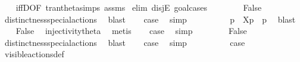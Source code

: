 \begin{isabellebody}
%
\isadelimproof
\ \ %
\endisadelimproof
%
\isatagproof
{}\isamarkupfalse%
\ iffD{}{\isacharbrackleft}{\kern0pt}OF\ tran{\isacharunderscore}{\kern0pt}theta{\isachardot}{\kern0pt}simps\ assms{\isacharbrackright}{\kern0pt}\isanewline
{}\isamarkupfalse%
\ {\isacharparenleft}{\kern0pt}elim\ disjE{\isacharcomma}{\kern0pt}\ goal{\isacharunderscore}{\kern0pt}cases{\isacharparenright}{\kern0pt}\isanewline
\ \ \isamarkupfalse%
\ {}\isanewline
\ \ \isamarkupfalse%
\ False\ \isamarkupfalse%
\ distinctness{\isacharunderscore}{\kern0pt}special{\isacharunderscore}{\kern0pt}actions\ \isamarkupfalse%
\ blast\isanewline
\ \ \isamarkupfalse%
\ {\isacharquery}{\kern0pt}case\ \isamarkupfalse%
\ simp\isanewline
{}\isamarkupfalse%
\isanewline
\ \ \isamarkupfalse%
\ {}\isanewline
\ \ \isamarkupfalse%
\ \isamarkupfalse%
\ p{\isacharprime}{\kern0pt}\ \ {\isacartoucheopen}{\isasymtheta}{\isacharbrackleft}{\kern0pt}X{\isacharbrackright}{\kern0pt}{\isacharparenleft}{\kern0pt}p{\isacharparenright}{\kern0pt}\ {\isacharequal}{\kern0pt}\ {\isasymtheta}{\isacharparenleft}{\kern0pt}p{\isacharprime}{\kern0pt}{\isacharparenright}{\kern0pt}{\isacartoucheclose}\ \isamarkupfalse%
\ blast\isanewline
\ \ \isamarkupfalse%
\ False\ \isamarkupfalse%
\ injectivity{\isacharunderscore}{\kern0pt}theta{\isacharparenleft}{\kern0pt}{}{\isacharparenright}{\kern0pt}\ \isamarkupfalse%
\ metis\isanewline
\ \ \isamarkupfalse%
\ {\isacharquery}{\kern0pt}case\ \isamarkupfalse%
\ simp\isanewline
{}\isamarkupfalse%
\isanewline
\ \ \isamarkupfalse%
\ {}\isanewline
\ \ \isamarkupfalse%
\ False\ \isamarkupfalse%
\ distinctness{\isacharunderscore}{\kern0pt}special{\isacharunderscore}{\kern0pt}actions\ \isamarkupfalse%
\ blast\isanewline
\ \ \isamarkupfalse%
\ {\isacharquery}{\kern0pt}case\ \isamarkupfalse%
\ simp\isanewline
{}\isamarkupfalse%
\isanewline
\ \ \isamarkupfalse%
\ {}\isanewline
\ \ \isamarkupfalse%
\ \isamarkupfalse%
\ {\isacharquery}{\kern0pt}case\ \isamarkupfalse%
\ visible{\isacharunderscore}{\kern0pt}actions{\isacharunderscore}{\kern0pt}def\ \isamarkupfalse%

\end{isabellebody}
